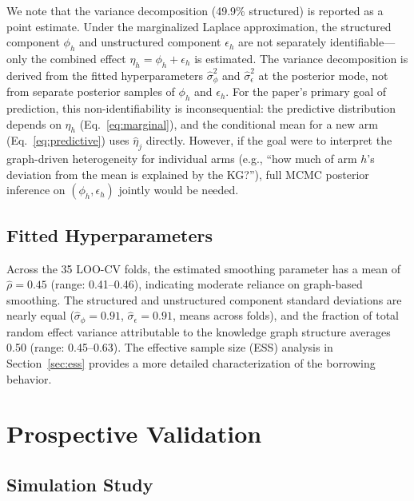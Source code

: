 \documentclass[12pt]{article}
\begin{document}
We note that the variance decomposition (49.9\% structured) is reported as a point estimate. Under the marginalized Laplace approximation, the structured component $\phi_h$ and unstructured component $\epsilon_h$ are not separately identifiable---only the combined effect $\eta_h = \phi_h + \epsilon_h$ is estimated. The variance decomposition is derived from the fitted hyperparameters $\hat{\sigma}_\phi^2$ and $\hat{\sigma}_\epsilon^2$ at the posterior mode, not from separate posterior samples of $\phi_h$ and $\epsilon_h$. For the paper's primary goal of prediction, this non-identifiability is inconsequential: the predictive distribution depends on $\eta_h$ (Eq.~\ref{eq:marginal}), and the conditional mean for a new arm (Eq.~\ref{eq:predictive}) uses $\hat{\eta}_j$ directly. However, if the goal were to interpret the graph-driven heterogeneity for individual arms (e.g., ``how much of arm $h$'s deviation from the mean is explained by the KG?''), full MCMC posterior inference on $(\phi_h, \epsilon_h)$ jointly would be needed.

\subsection{Fitted Hyperparameters}
\label{sec:fitted}

Across the 35 LOO-CV folds, the estimated smoothing parameter has a mean of $\hat{\rho} = 0.45$ (range: 0.41--0.46), indicating moderate reliance on graph-based smoothing. The structured and unstructured component standard deviations are nearly equal ($\hat{\sigma}_\phi = 0.91$, $\hat{\sigma}_\epsilon = 0.91$, means across folds), and the fraction of total random effect variance attributable to the knowledge graph structure averages 0.50 (range: 0.45--0.63). The effective sample size (ESS) analysis in Section~\ref{sec:ess} provides a more detailed characterization of the borrowing behavior.

\section{Prospective Validation}
\label{sec:prospective}

\subsection{Simulation Study}
\label{sec:simulation}
\end{document}
